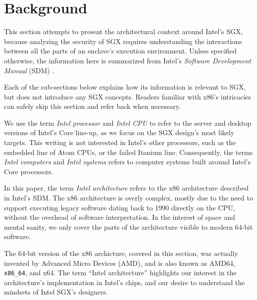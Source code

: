 \section{Background}
\label{sec:background}

This section attempts to present the architectural context around Intel's SGX,
because analyzing the security of SGX requires understanding the interactions
between all the parts of an enclave's execution environment. Unless specified
otherwise, the information here is summarized from Intel's
\textit{Software Development Manual} (SDM) \cite{intel2015sdm}.

Each of the sub-sections below explains how its information is relevant to SGX,
but does not introduce any SGX concepts. Readers familiar with x86's
intricacies can safely skip this section and refer back when necessary.

We use the term \textit{Intel processor} and \textit{Intel CPU} to refer to the
server and desktop versions of Intel's Core line-up, as we focus on the SGX
design's most likely targets. This writing is not interested in Intel's other
processors, such as the embedded line of Atom CPUs, or the failed Itanium line.
Consequently, the terms \textit{Intel computers} and \textit{Intel systems}
refers to computer systems built around Intel's Core processors.

In this paper, the term \textit{Intel architecture} refers to the x86
architecture described in Intel's SDM. The x86 architecture is overly complex,
mostly due to the need to support executing legacy software dating back to 1990
directly on the CPU, without the overhead of software interpretation. In the
interest of space and mental sanity, we only cover the parts of the
architecture visible to modern 64-bit software.

The 64-bit version of the x86 archicture, covered in this section, was actually
invented by Advanced Micro Devices (AMD), and is also known as AMD64,
\texttt{x86\_64}, and x64. The term ``Intel architecture'' highlights our
interest in the architecture's implementation in Intel's chips, and our desire
to understand the mindsets of Intel SGX's designers.



















